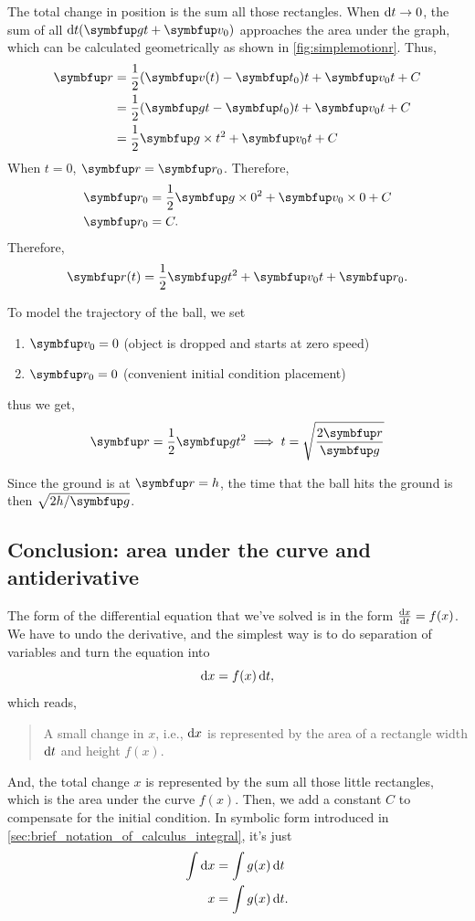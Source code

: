 The total change in position is the sum all those rectangles. When \(\odif{t} \appr 0\), the sum of all \(\odif{t}(\vv{g}t + \vv{v}_0)\) approaches the area under the graph, which can be calculated geometrically as shown in \cref{fig:simplemotionr}. Thus,
\begin{align}
  \vv{r} & = \frac{1}{2}(\vv{v}(t) - \vv{t}_0)t + \vv{v}_0t + C \\
         & = \frac{1}{2}(\vv{g}t - \vv{t}_0)t + \vv{v}_0t + C   \\
         & = \frac{1}{2}\vv{g}\times t^2 + \vv{v}_0t + C
\end{align}
When \(t = 0\), \(\vv{r} = \vv{r}_0\). Therefore,
\begin{align*}
  \vv{r}_0 & = \frac{1}{2}\vv{g}\times 0^2 + \vv{v}_0\times 0 + C \\
  \vv{r}_0 & = C.
\end{align*}
Therefore,
\begin{equation}
  \vv{r}(t) = \frac{1}{2}\vv{g}t^2 + \vv{v}_0t + \vv{r}_0.
\end{equation}

To model the trajectory of the ball, we set
\begin{enumerate}[noitemsep]
  \item \(\vv{v}_0 = 0\) (object is dropped and starts at zero speed)
  \item \(\vv{r}_0 = 0\) (convenient initial condition placement)
\end{enumerate}
thus we get,
\begin{gather}
  \vv{r} = \frac{1}{2}\vv{g}t^2 \implies t = \sqrt{\frac{2\vv{r}}{\vv{g}}}
\end{gather}

Since the ground is at \(\vv{r} = h\), the time that the ball hits the ground is then \(\sqrt{2h/\vv{g}}\).

\subsection{Conclusion: area under the curve and antiderivative}

The form of the differential equation that we've solved is in the form \(\odv{x}{t} = f(x)\). We have to undo the derivative, and the simplest way is to do separation of variables and turn the equation into
\begin{equation}
  \odif{x} = f(x)\odif{t},
\end{equation}
which reads,
\begin{quotation}
  A small change in \(x\), i.e., \(\odif{x}\) is represented by the area of a rectangle width \(\odif{t}\) and height \(f(x)\).
\end{quotation}
And, the total change \(x\) is represented by the sum all those little rectangles, which is the area under the curve \(f(x)\). Then, we add a constant \(C\) to compensate for the initial condition. In symbolic form introduced in \cref{sec:brief_notation_of_calculus_integral}, it's just
\begin{align}
  \int\odif{x} & = \int g(x)\odif{t}  \\
  x            & = \int g(x)\odif{t}.
\end{align}

